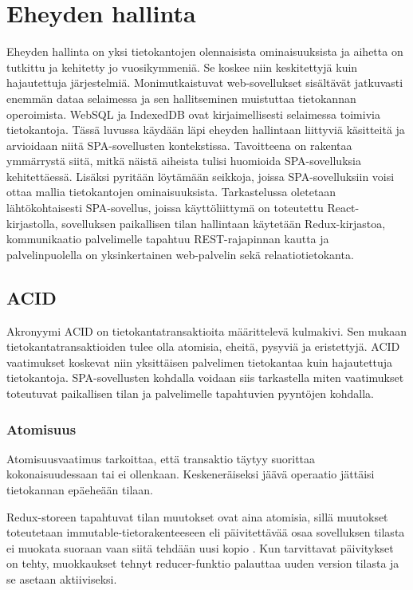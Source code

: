 \documentclass[finnish,twoside,censored,csm,sw-track-2018]{HYthesisML}
\begin{document}
\chapter{Eheyden hallinta}
\label{sec-eheydenhallinta-teoria}

Eheyden hallinta on yksi tietokantojen olennaisista ominaisuuksista ja aihetta on tutkittu ja kehitetty jo vuosikymmeniä. Se koskee niin keskitettyjä kuin hajautettuja järjestelmiä. Monimutkaistuvat web-sovellukset sisältävät jatkuvasti enemmän dataa selaimessa ja sen hallitseminen muistuttaa tietokannan operoimista. WebSQL ja IndexedDB ovat kirjaimellisesti selaimessa toimivia tietokantoja. Tässä luvussa käydään läpi eheyden hallintaan liittyviä käsitteitä ja arvioidaan niitä SPA-sovellusten kontekstissa. Tavoitteena on rakentaa ymmärrystä siitä, mitkä näistä aiheista tulisi huomioida SPA-sovelluksia kehitettäessä. Lisäksi pyritään löytämään seikkoja, joissa SPA-sovelluksiin voisi ottaa mallia tietokantojen ominaisuuksista. Tarkastelussa oletetaan lähtökohtaisesti SPA-sovellus, joissa käyttöliittymä on toteutettu React-kirjastolla, sovelluksen paikallisen tilan hallintaan käytetään Redux-kirjastoa, kommunikaatio palvelimelle tapahtuu REST-rajapinnan kautta ja palvelinpuolella on yksinkertainen web-palvelin sekä relaatiotietokanta.

\section{ACID}
\label{sec-acid}

Akronyymi ACID \citep{acid} on tietokantatransaktioita \citep{gray-1981} määrittelevä kulmakivi. Sen mukaan tietokantatransaktioiden tulee olla atomisia, eheitä, pysyviä ja eristettyjä. ACID vaatimukset koskevat niin yksittäisen palvelimen tietokantaa kuin hajautettuja tietokantoja. SPA-sovellusten kohdalla voidaan siis tarkastella miten vaatimukset toteutuvat paikallisen tilan ja palvelimelle tapahtuvien pyyntöjen kohdalla. 

\subsection{Atomisuus}

Atomisuusvaatimus tarkoittaa, että transaktio täytyy suorittaa kokonaisuudessaan tai ei ollenkaan. Keskeneräiseksi jäävä operaatio jättäisi tietokannan epäeheään tilaan.

Redux-storeen tapahtuvat tilan muutokset ovat aina atomisia, sillä muutokset toteutetaan immutable-tietorakenteeseen eli päivitettävää osaa sovelluksen tilasta ei muokata suoraan vaan siitä tehdään uusi kopio \citep{redux-principles}. Kun tarvittavat päivitykset on tehty, muokkaukset tehnyt reducer-funktio palauttaa uuden version tilasta ja se asetaan aktiiviseksi.
\end{document}
